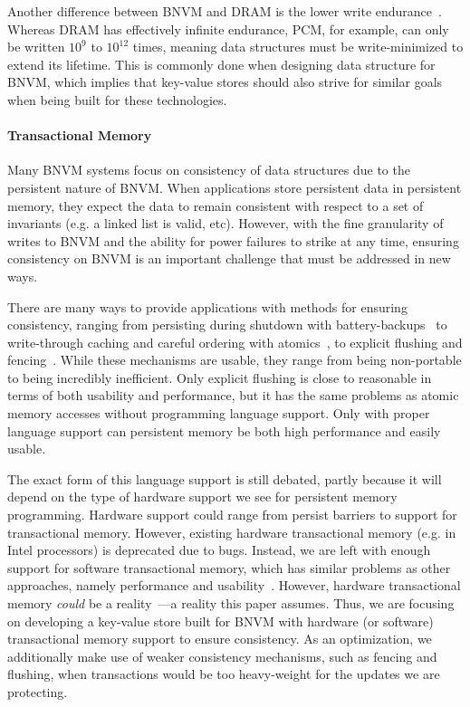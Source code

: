 Another difference between BNVM and DRAM is the lower write
endurance~\cite{dhiman_pdram:_2009}. Whereas DRAM has effectively infinite
endurance, PCM, for example, can only be written $10^9$ to $10^{12}$ times,
meaning data structures must be write-minimized to extend its lifetime. This is
commonly done when designing data structure for BNVM, which implies that
key-value stores should also strive for similar goals when being built for these
technologies.

\paragraph{Transactional Memory}

Many BNVM systems focus on consistency of data structures due to the
persistent nature of BNVM. When applications store persistent data in
persistent memory, they expect the data to remain consistent with respect to a
set of invariants (e.g. a linked list is valid, etc). However, with the fine
granularity of writes to BNVM and the ability for power failures to strike at
any time, ensuring consistency on BNVM is an important challenge that must be
addressed in new ways.

There are many ways to provide applications with methods for ensuring
consistency, ranging from persisting during shutdown with
battery-backups~\cite{narayanan:asplos12} to write-through caching and careful
ordering with atomics~\cite{bhandari2012implications}, to explicit flushing and
fencing~\cite{condit:sosp09}. While these mechanisms are usable, they range from
being non-portable to being incredibly inefficient. Only explicit flushing is
close to reasonable in terms of both usability and performance, but it has the
same problems as atomic memory accesses without programming language support.
Only with proper language support can persistent memory be both high performance
and easily usable.

The exact form of this language support is still debated, partly because it will
depend on the type of hardware support we see for persistent memory programming.
Hardware support could range from persist barriers to support for transactional
memory. However, existing hardware transactional memory (e.g. in Intel
processors) is deprecated due to bugs. Instead, we are left with enough support
for software transactional memory, which has similar problems as other
approaches, namely performance and usability~\cite{stm}. However, hardware
transactional memory \textit{could} be a
reality~\cite{kolli:asplos16,lu:tos16,wang:cal15}---a reality this paper
assumes. Thus, we are focusing on developing a key-value store built for BNVM
with hardware (or software) transactional memory support to ensure consistency.
As an optimization, we additionally make use of weaker consistency mechanisms,
such as fencing and flushing, when transactions would be too heavy-weight for
the updates we are protecting.

